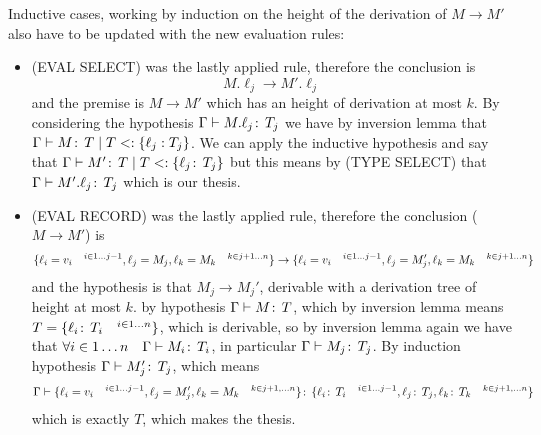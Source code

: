 Inductive cases, working by induction on the height of the derivation
of \(M \to M'\) also have to be updated with the new evaluation rules:
\begin{itemize}
\item (EVAL SELECT) was the lastly applied rule, therefore the
  conclusion is \[M.\ell_j \to M'.\ell_j\] and the premise is \(M\to
  M'\) which has an height of derivation at most \(k\). By considering
  the hypothesis \(\Gamma\vdash M.\ell_j \!:\,T_j\) we have by
  inversion lemma that \(\Gamma\vdash M \!:\,T \mid T <: \{\ell_j
    : T_j\}\). We can apply the inductive hypothesis and say that
  \(\Gamma\vdash M' \!:\,T \mid T <: \{\ell_j \!:\,T_j\}\) but
  this means by (TYPE SELECT) that \(\Gamma \vdash M'.\ell_j
  \!:\,T_j\) which is our thesis.
\item (EVAL RECORD) was the lastly applied rule, therefore the
  conclusion (\(M \to M'\)) is \[\{\ell_i = v_i \quad^{i\in 1\dots
      j-1}, \ell_j = M_j, \ell_k = M_k \quad^{k\in j+1\dots n}\} \to
  \{ \ell_i = v_i \quad^{i\in 1\dots j-1}, \ell_j = M_j', \ell_k =
    M_k \quad^{k\in j+1\dots n}\}\] and the hypothesis is that \(M_j\to
  M_j'\), derivable with a derivation tree of height at most \(k\). by
  hypothesis \(\Gamma \vdash M \!:\,T\), which by inversion lemma
  means \(T = \{\ell_i \!:\,T_i \quad^{i \in 1 \dots n}\}\), which
  is derivable, so by inversion lemma again we have that \(\forall i
  \in 1 \dots n \quad \Gamma\vdash M_i \!:\,T_i\), in particular
  \(\Gamma \vdash M_j \!:\,T_j\). By induction hypothesis \(\Gamma
  \vdash M_j' \!:\,T_j\), which means \[\Gamma \vdash \{\ell_i =
    v_i \quad^{i\in 1 \dots j-1}, \ell_j = M_j', \ell_k = M_k
    \quad^{k\in j+1, \dots n}\} \!:\,\{\ell_i \!:\,T_i
      \quad^{i\in 1 \dots j-1}, \ell_j \!:\,T_j, \ell_k \!:\,T_k
      \quad^{k\in j+1, \dots n}\}\] which is exactly \(T\), which
  makes the thesis.
\end{itemize}
